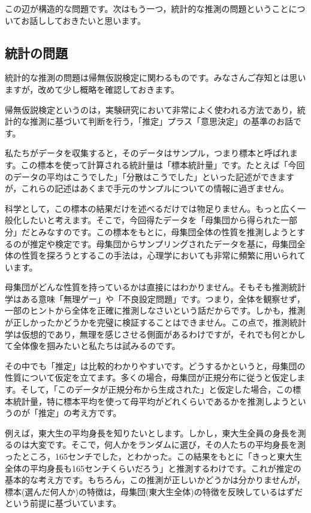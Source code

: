 \documentclass{ltjsbook}
\begin{document}
この辺が構造的な問題です。次はもう一つ，統計的な推測の問題ということについてお話ししておきたいと思います。

\subsection{統計の問題}

統計的な推測の問題は帰無仮説検定に関わるものです。みなさんご存知とは思いますが，改めて少し概略を確認しておきます。

帰無仮説検定というのは，実験研究において非常によく使われる方法であり，統計的な推測に基づいて判断を行う，「推定」プラス「意思決定」の基準のお話です。

私たちがデータを収集すると，そのデータはサンプル，つまり標本と呼ばれます。この標本を使って計算される統計量は「標本統計量」です。たとえば「今回のデータの平均はこうでした」「分散はこうでした」といった記述ができますが，これらの記述はあくまで手元のサンプルについての情報に過ぎません。

科学として，この標本の結果だけを述べるだけでは物足りません。もっと広く一般化したいと考えます。そこで，今回得たデータを「母集団から得られた一部分」だとみなすのです。この標本をもとに，母集団全体の性質を推測しようとするのが推定や検定です。母集団からサンプリングされたデータを基に，母集団全体の性質を探ろうとするこの手法は，心理学においても非常に頻繁に用いられています。

母集団がどんな性質を持っているかは直接にはわかりません。そもそも推測統計学はある意味「無理ゲー」や「不良設定問題」です。つまり，全体を観察せず，一部のヒントから全体を正確に推測しなさいという話だからです。しかも，推測が正しかったかどうかを完璧に検証することはできません。この点で，推測統計学は仮想的であり，無理を感じさせる側面があるわけですが，それでも何とかして全体像を掴みたいと私たちは試みるのです。

その中でも「推定」は比較的わかりやすいです。どうするかというと，母集団の性質について仮定を立てます。多くの場合，母集団が正規分布に従うと仮定します。そして，「このデータが正規分布から生成された」と仮定した場合，この標本統計量，特に標本平均を使って母平均がどれくらいであるかを推測しようというのが「推定」の考え方です。

例えば，東大生の平均身長を知りたいとします。しかし，東大生全員の身長を測るのは大変です。そこで，何人かをランダムに選び，その人たちの平均身長を測ったところ，165センチでした，とわかった。この結果をもとに「きっと東大生全体の平均身長も165センチくらいだろう」と推測するわけです。これが推定の基本的な考え方です。もちろん，この推測が正しいかどうかは分かりませんが，標本(選んだ何人か)の特徴は，母集団(東大生全体)の特徴を反映しているはずだという前提に基づいています。
\end{document}
